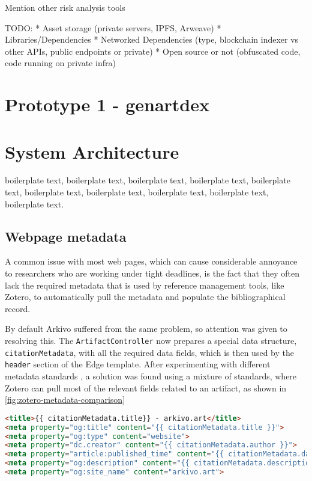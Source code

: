 Mention other risk analysis tools \cite{l2beatL2BEATStateLayer2024}

TODO:
* Asset storage (private servers, IPFS, Arweave)
* Libraries/Dependencies
* Networked Dependencies (type, blockchain indexer vs other APIs, public endpoints or private)
* Open source or not (obfuscated code, code running on private infra)








\section {Prototype 1 - genartdex}

\section{System Architecture}

boilerplate text, boilerplate text, boilerplate text, boilerplate text, boilerplate text, boilerplate text, boilerplate text, boilerplate text, boilerplate text, boilerplate text.


\subsection{Webpage metadata}

A common issue with most web pages, which can cause considerable annoyance to researchers who are working under tight deadlines, is the fact that they often lack the required metadata that is used by reference management tools, like Zotero, to automatically pull the metadata and populate the bibliographical record.

By default Arkivo suffered from the same problem, so attention was given to resolving this.
The \texttt{ArtifactController} now prepares a special data structure, \texttt{citationMetadata}, with all the required data fields, which is then used by the \texttt{header} section of the Edge template.
After experimenting with different metadata standards \cite{DevExposing_metadataZotero}\cite{zahidOpenGraphMeta2023} , a solution was found using a mixture of standards, where Zotero can pull most of the relevant fields related to an artifact, as shown in \autoref{fig:zotero-metadata-comparison}


\begin{lstlisting}[language=HTML, caption={Artifact page metadata}] 
<title>{{ citationMetadata.title}} - arkivo.art</title>
<meta property="og:title" content="{{ citationMetadata.title }}">
<meta property="og:type" content="website">
<meta property="dc.creator" content="{{ citationMetadata.author }}">
<meta property="article:published_time" content="{{ citationMetadata.date }}">
<meta property="og:description" content="{{ citationMetadata.description }}">
<meta property="og:site_name" content="arkivo.art">
\end{lstlisting}


